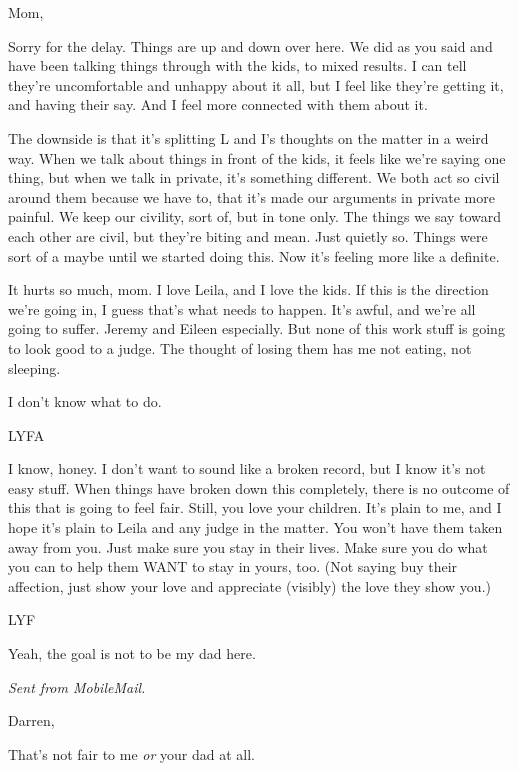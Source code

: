 \secdiv{}

Mom,

Sorry for the delay. Things are up and down over here. We did as you said and have been talking things through with the kids, to mixed results. I can tell they're uncomfortable and unhappy about it all, but I feel like they're getting it, and having their say. And I feel more connected with them about it.

The downside is that it's splitting L and I's thoughts on the matter in a weird way. When we talk about things in front of the kids, it feels like we're saying one thing, but when we talk in private, it's something different. We both act so civil around them because we have to, that it's made our arguments in private more painful. We keep our civility, sort of, but in tone only. The things we say toward each other are civil, but they're biting and mean. Just quietly so. Things were sort of a maybe until we started doing this. Now it's feeling more like a definite.

It hurts so much, mom. I love Leila, and I love the kids. If this is the direction we're going in, I guess that's what needs to happen. It's awful, and we're all going to suffer. Jeremy and Eileen especially. But none of this work stuff is going to look good to a judge. The thought of losing them has me not eating, not sleeping.

I don't know what to do.

LYFA

\secdiv{}

I know, honey. I don't want to sound like a broken record, but I know it's not easy stuff. When things have broken down this completely, there is no outcome of this that is going to feel fair. Still, you love your children. It's plain to me, and I hope it's plain to Leila and any judge in the matter. You won't have them taken away from you. Just make sure you stay in their lives. Make sure you do what you can to help them WANT to stay in yours, too. (Not saying buy their affection, just show your love and appreciate (visibly) the love they show you.)

LYF

\secdiv{}

Yeah, the goal is not to be my dad here.

\emph{Sent from MobileMail.}

\secdiv{}

Darren,

That's not fair to me \emph{or} your dad at all.

